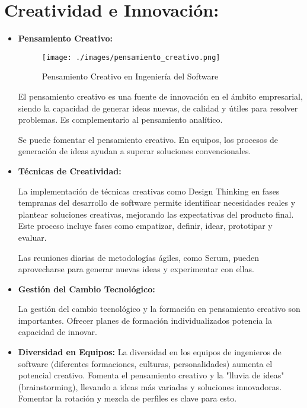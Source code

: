 \documentclass[a4paper,12pt,twoside]{article}
\begin{document}
 

\section{Creatividad e Innovación:}
\begin{itemize}
    \item \textbf{Pensamiento Creativo:}
    
    \begin{figure}[H]
        \centering
        \texttt{[image: ./images/pensamiento\_creativo.png]}
        \caption{Pensamiento Creativo en Ingeniería del Software}
        \label{fig:creatividad}
    \end{figure}
    
    El pensamiento creativo es una fuente de innovación en el ámbito empresarial, siendo la capacidad 
    de generar ideas nuevas, de calidad y útiles para resolver problemas. 
    Es complementario al pensamiento analítico.

    Se puede fomentar el pensamiento creativo. En equipos, los procesos de generación de ideas 
    ayudan a superar soluciones convencionales.

    \item \textbf{Técnicas de Creatividad:}
     
    La implementación de técnicas creativas como Design Thinking en fases tempranas del desarrollo 
    de software permite identificar necesidades reales y plantear soluciones creativas, mejorando 
    las expectativas del producto final. Este proceso incluye fases como empatizar, definir, idear, 
    prototipar y evaluar.

    Las reuniones diarias de metodologías ágiles, como Scrum, pueden aprovecharse para generar 
    nuevas ideas y experimentar con ellas.

    \item \textbf{Gestión del Cambio Tecnológico:}

    La gestión del cambio tecnológico y la formación en pensamiento creativo son importantes. 
    Ofrecer planes de formación individualizados potencia la capacidad de innovar.

    \item \textbf{Diversidad en Equipos:}
    La diversidad en los equipos de ingenieros de software (diferentes formaciones, culturas, 
    personalidades) aumenta el potencial creativo. Fomenta el pensamiento creativo y la "lluvia 
    de ideas" (brainstorming), llevando a ideas más variadas y soluciones innovadoras. Fomentar 
    la rotación y mezcla de perfiles es clave para esto.

\end{itemize}
\end{document}
